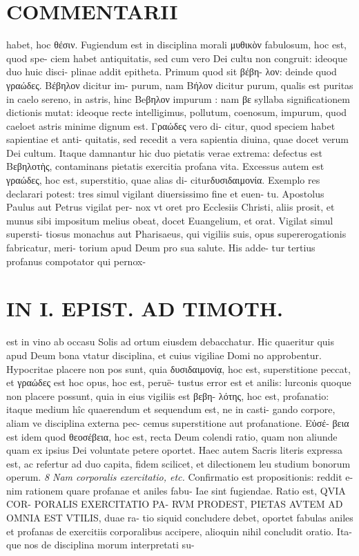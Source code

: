 \documentclass{article}
\begin{document}
\begin{pages}
\section*{COMMENTARII }
\marginpar{[ p.96 ]}\pstart habet, hoc θέσιν. Fugiendum est in disciplina morali μυθικὸν fabulosum, hoc est, quod spe- ciem habet antiquitatis, sed cum vero Dei cultu non congruit: ideoque duo huic disci- plinae addit epitheta. Primum quod sit βέβη- λον: deinde quod γραώδες. Βέβηλον dicitur im- purum, nam Βήλον dicitur purum, qualis est puritas in caelo sereno, in astris, hinc Beβηλον impurum : nam βε syllaba significationem dictionis mutat: ideoque recte intelligimus, pollutum, coenosum, impurum, quod caeloet astris minime dignum est. Γραώδες vero di- citur, quod speciem habet sapientiae et anti- quitatis, sed recedit a vera sapientia diuina, quae docet verum Dei cultum.  \pend\pstart Itaque damnantur hic duo pietatis verae extrema: defectus est Bεβηλοτὴς, contaminans pietatis exercitia profana vita. Excessus autem est γραώδες, hoc est, superstitio, quae alias di- citurδυσιδαιμονία. Exemplo res declarari potest: tres simul vigilant diuersissimo fine et euen- tu. Apostolus Paulus aut Petrus vigilat per- nox vt oret pro Ecclesiis Christi, aliis prosit, et munus sibi impositum melius obeat, docet Euangelium, et orat. Vigilat simul supersti- tiosus monachus aut Pharisaeus, qui vigiliis suis, opus supererogationis fabricatur, meri- torium apud Deum pro sua salute. His adde- tur tertius profanus compotator qui pernox-  \pend
\section*{IN I. EPIST. AD TIMOTH. }
\marginpar{[ p.97 ]}
\marginpar{[ p.G ]}\pstart est in vino ab occasu Solis ad ortum eiusdem debacchatur. Hic quaeritur quis apud Deum bona vtatur disciplina, et cuius vigiliae Domi no approbentur. Hypocritae placere non pos sunt, quia δυσιδαιμονίᾳ, hoc est, superstitione peccat, et γραώδες est hoc opus, hoc est, peruë- tustus error est et anilis: lurconis quoque non placere possunt, quia in eius vigiliis est βεβη- λότης, hoc est, profanatio: itaque medium hîc quaerendum et sequendum est, ne in casti- gando corpore, aliam ve disciplina externa pec- cemus superstitione aut profanatione. Εὐσέ- βεια est idem quod θεοσέβεια, hoc est, recta Deum colendi ratio, quam non aliunde quam ex ipsius Dei voluntate petere oportet. Haec autem Sacris literis expressa est, ac refertur ad duo capita, fidem scilicet, et dilectionem leu studium bonorum operum.  \pend
\textit{8 Nam corporalis exercitatio, etc. }\pstart Confirmatio est propositionis: reddit e- nim rationem quare profanae et aniles fabu- Iae sint fugiendae. Ratio est, QVIA COR- PORALIS EXERCITATIO PA- RVM PRODEST, PIETAS AVTEM AD OMNIA EST VTILIS, duae ra- tio siquid concludere debet, oportet fabulas aniles et profanas de exercitiis corporalibus accipere, alioquin nihil concludit oratio. Ita- que nos de disciplina morum interpretati su-  \pend

\end{pages}
\end{document}
